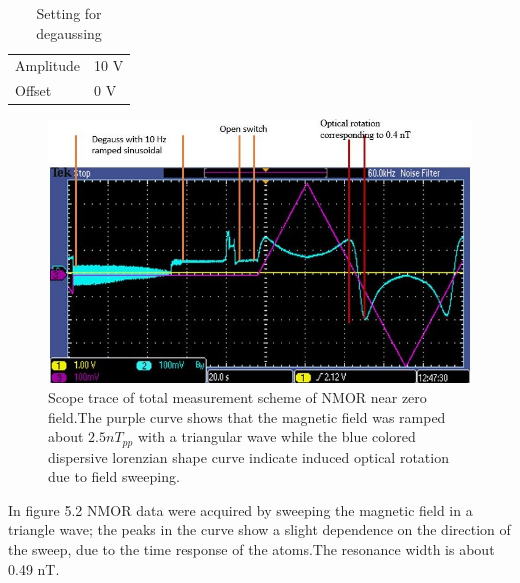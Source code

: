 \documentclass[12pt]{report}
\begin{document}
\begin{itemize}
\begin{table}[h]
\begin{tabular}{|l |l|}
Amplitude   &  10 V \\
Offset  &       0 V  \\
\hline
\end{tabular}
\caption{Setting for degaussing }
\end{table}
     \begin{figure}[h]
 \centering\includegraphics[width=0.7\linewidth]{figures/scope_trace_of_field_sweeping}
\caption{Scope trace of total measurement scheme of NMOR near zero field.The purple curve shows that the magnetic field was ramped about $ 2.5 nT_{pp}$ with a triangular wave while the blue colored dispersive lorenzian shape curve indicate induced optical rotation due to field sweeping. }
\end{figure}
\newpage
In figure 5.2 NMOR data were acquired by sweeping the magnetic field in a triangle wave; the peaks in the curve show a slight dependence on the direction of the sweep, due to the time response of the atoms.The resonance width is about 0.49 nT.


\end{itemize}
\end{document}
